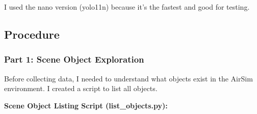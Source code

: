 I used the nano version (yolo11n) because it's the fastest and good for testing.

\subsection{Procedure}

\subsubsection{Part 1: Scene Object Exploration}

Before collecting data, I needed to understand what objects exist in the AirSim environment. I created a script to list all objects.

\textbf{Scene Object Listing Script (list\_objects.py):}

